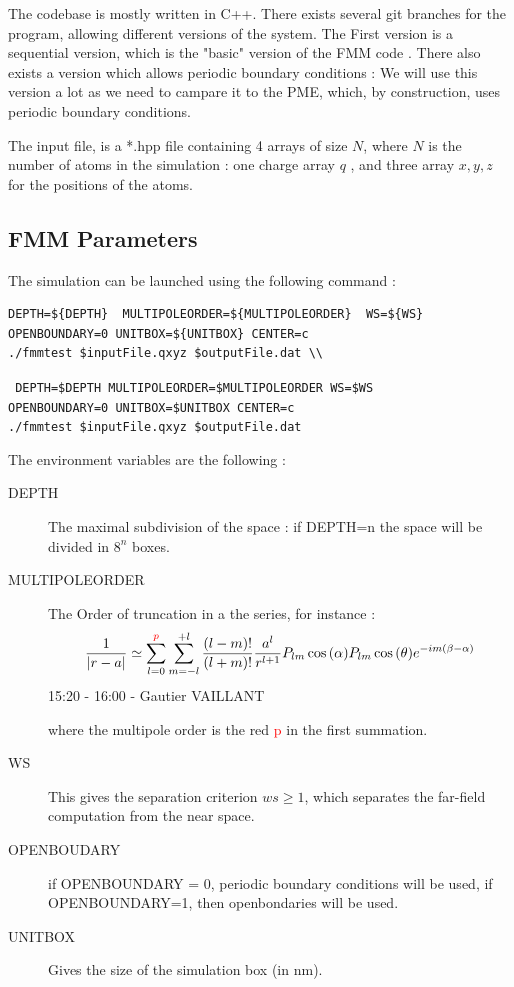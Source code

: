 \documentclass[12pt,twoside,a4paper]{report}
\begin{document}
	The codebase is mostly written in C++.  There exists several git branches for the program, allowing different versions of the system.	
The First version is a sequential version, which is the "basic" version of the FMM code . There also exists a version which allows periodic boundary conditions : We will use this version a lot as we need to campare it to the PME, which, by construction, uses periodic boundary conditions.	

The input file, is a *.hpp file containing 4 arrays of size $N$, where $N$ is the number of atoms in the simulation : one charge array $q$ , and three array $x,y,z$ for the positions of the atoms.

\subsection{FMM Parameters}

The simulation can be launched using the following command : 

\begin{verbatim}
DEPTH=${DEPTH}  MULTIPOLEORDER=${MULTIPOLEORDER}  WS=${WS} 
OPENBOUNDARY=0 UNITBOX=${UNITBOX} CENTER=c 
./fmmtest $inputFile.qxyz $outputFile.dat \\	

\end{verbatim}

{\centering\tt { DEPTH=\${DEPTH}  MULTIPOLEORDER=\${MULTIPOLEORDER}  WS=\${WS} \\ 
OPENBOUNDARY=0 UNITBOX=\${UNITBOX} CENTER=c \\
./fmmtest \$inputFile.qxyz \$outputFile.dat \\					
 }}

The environment variables are the following :

\begin{description}
\item[DEPTH] The maximal subdivision of the space : if DEPTH=n the space will be divided in $8^{n}$ boxes.

\item[MULTIPOLEORDER] The Order of truncation in a the series, for instance :
\begin{equation*}
	\frac{1}{|r - a|} \simeq \sum\limits_{l=0}^{\textcolor{red}{p}} \sum\limits_{m = -l}^{+l} \frac{(l-m)!}{(l+m)!} \frac{a^l}{r^{l+1}} P_{lm}\cos{(\alpha)}P_{lm}\cos{(\theta)}e^{-im(\beta - \alpha)}
	\end{equation*}15:20 - 16:00 - Gautier VAILLANT
	
	where the multipole order is the red \textcolor{red}{p} in the first summation.
	
	
\item[WS] This gives the separation criterion $ws \geq 1$, which separates the far-field computation from the near space.

\item[OPENBOUDARY] if OPENBOUNDARY = 0, periodic boundary conditions will be used, if OPENBOUNDARY=1, then openbondaries will be used.

\item[UNITBOX] Gives the size of the simulation box (in nm).

\end{description}
 	
\end{document}
